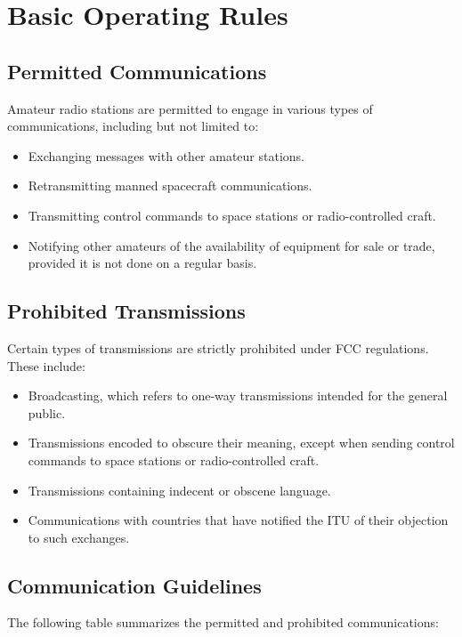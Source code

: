 \section{Basic Operating Rules}
\label{sec:basic_rules}

\subsection*{Permitted Communications}
Amateur radio stations are permitted to engage in various types of communications, including but not limited to:
\begin{itemize}
    \item Exchanging messages with other amateur stations.
    \item Retransmitting manned spacecraft communications.
    \item Transmitting control commands to space stations or radio-controlled craft.
    \item Notifying other amateurs of the availability of equipment for sale or trade, provided it is not done on a regular basis.
\end{itemize}

\subsection*{Prohibited Transmissions}
Certain types of transmissions are strictly prohibited under FCC regulations. These include:
\begin{itemize}
    \item Broadcasting, which refers to one-way transmissions intended for the general public.
    \item Transmissions encoded to obscure their meaning, except when sending control commands to space stations or radio-controlled craft.
    \item Transmissions containing indecent or obscene language.
    \item Communications with countries that have notified the ITU of their objection to such exchanges.
\end{itemize}

\subsection*{Communication Guidelines}
The following table summarizes the permitted and prohibited communications:

